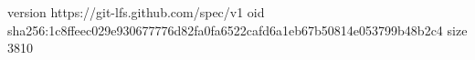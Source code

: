 version https://git-lfs.github.com/spec/v1
oid sha256:1c8ffeec029e930677776d82fa0fa6522cafd6a1eb67b50814e053799b48b2c4
size 3810
